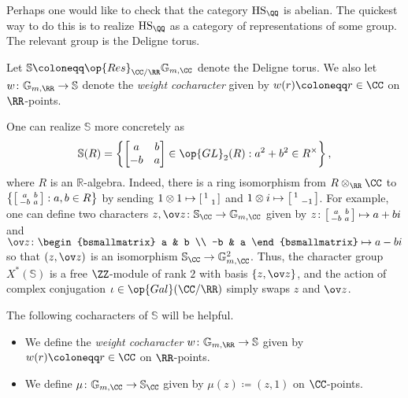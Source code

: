 \documentclass[../thesis.tex]{subfiles}
\begin{document}
Perhaps one would like to check that the category $\mathrm{HS}_\QQ$ is abelian. The quickest way to do this is to realize $\mathrm{HS}_\QQ$ as a category of representations of some group. The relevant group is the Deligne torus.
\begin{notation}
	Let $\mathbb S\coloneqq\op{Res}_{\CC/\RR}\mathbb G_{m,\CC}$ denote the Deligne torus. We also let $w\colon\mathbb G_{m,\RR}\to\mathbb S$ denote the \textit{weight cocharacter} given by $w(r)\coloneqq r\in\CC$ on $\RR$-points.
\end{notation}
\begin{remark} \label{rem:concrete-deligne-torus}
	One can realize $\mathbb S$ more concretely as
	\[\mathbb S(R)=\left\{\begin{bmatrix}
		a & b \\ -b & a
	\end{bmatrix}\in{\op{GL}_2(R)}:a^2+b^2\in R^\times\right\},\]
	where $R$ is an $\mathbb R$-algebra. Indeed, there is a ring isomorphism from $R\otimes_\RR\CC$ to $\left\{\begin{bsmallmatrix}
		a & b \\ -b & a
	\end{bsmallmatrix}:a,b\in R\right\}$ by sending $1\otimes1\mapsto\begin{bsmallmatrix}
		1 \\ & 1
	\end{bsmallmatrix}$ and $1\otimes i\mapsto\begin{bsmallmatrix}
		1 \\ & -1
	\end{bsmallmatrix}$. For example, one can define two characters $z,\ov z\colon\mathbb S_\CC\to\mathbb G_{m,\CC}$ given by $z\colon\begin{bsmallmatrix}
		a & b \\ -b & a
	\end{bsmallmatrix}\mapsto a+bi$ and $\ov z\colon\begin{bsmallmatrix}
		a & b \\ -b & a
	\end{bsmallmatrix}\mapsto a-bi$ so that $(z,\ov z)$ is an isomorphism $\mathbb S_\CC\to\mathbb G_{m,\CC}^2$. Thus, the character group $X^*(\mathbb S)$ is a free $\ZZ$-module of rank $2$ with basis $\{z,\ov z\}$, and the action of complex conjugation $\iota\in\op{Gal}(\CC/\RR)$ simply swaps $z$ and $\ov z$.
\end{remark}
\begin{example}
	The following cocharacters of $\mathbb S$ will be helpful.
	\begin{itemize}
		\item We define the \textit{weight cocharacter} $w\colon\mathbb G_{m,\RR}\to\mathbb S$ given by $w(r)\coloneqq r\in\CC$ on $\RR$-points.
		\item We define $\mu\colon\mathbb G_{m,\CC}\to\mathbb S_\CC$ given by $\mu(z)\coloneqq(z,1)$ on $\CC$-points.
	\end{itemize}
\end{example}
\end{document}
